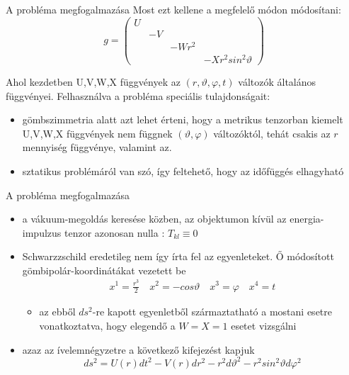 \documentclass[10pt]{beamer}
\begin{document}
\begin{frame}[t]{A probléma megfogalmazása}
Most ezt kellene a megfelelő módon módosítani:
$$
g = \begin{pmatrix}
U& & &  \\
& -V& &  \\
& & -Wr^{2}&  \\
& & & -Xr^{2}sin^{2}\vartheta
\end{pmatrix}
$$
\par Ahol kezdetben U,V,W,X függvények az $(r,\vartheta,\varphi,t)$ változók általános függvényei. Felhasználva a probléma
speciális tulajdonságait:
\begin{itemize}
\item gömbszimmetria alatt azt lehet érteni, hogy a metrikus tenzorban kiemelt U,V,W,X függvények nem függnek $(\vartheta, 
\varphi)$ változóktól, tehát csakis az $r$ mennyiség függvénye, valamint az.
\item sztatikus problémáról van szó, így feltehető, hogy az időfüggés elhagyható
\end{itemize}
\end{frame}

\begin{frame}[t]{A probléma megfogalmazása}
\begin{itemize}
\item a vákuum-megoldás keresése közben, az objektumon kívül az energia-impulzus tenzor azonosan nulla : $T_{kl}\equiv 0$
\item Schwarzzschild eredetileg nem így írta fel az egyenleteket. Ő módosított gömbipolár-koordinátákat vezetett be
\begin{gather*}
x^{1} = \frac{r^{3}}{2} \quad x^{2} = -cos\vartheta \quad x^{3} = \varphi \quad x^{4} = t
\end{gather*}
\begin{itemize}
\item az ebből $ds^{2}$-re kapott egyenletből származtatható a mostani esetre vonatkoztatva, hogy elegendő a $W = X = 1$ esetet
vizsgálni
\end{itemize}
\item azaz az ívelemnégyzetre a következő kifejezést kapjuk
 $$ ds^{2} = U(r)dt^{2} - V(r)dr^{2} -r^{2}d\vartheta^{2} -r^{2}sin^{2}\vartheta d\varphi^{2} $$
\end{itemize}
\end{frame}
\end{document}
